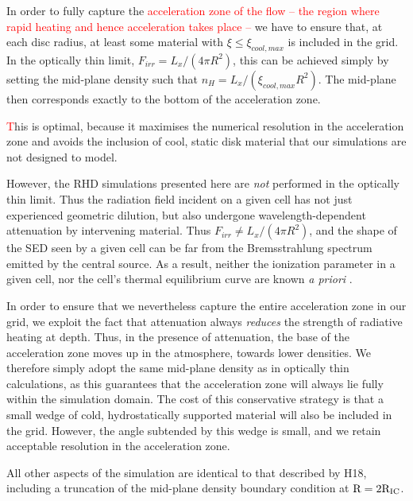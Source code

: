\documentclass[a4paper,fleqn,usenatbib]{mnras}
\begin{document}
In order to fully capture the \textcolor{red}{acceleration zone of the
  flow -- the region where rapid heating and hence acceleration takes place -- }
we have
to ensure that, at each disc radius, at least some material with $\xi
\leq \xi_{cool,max}$ is included in the grid.
In the optically thin limit,
$F_{irr} = L_x / (4\pi R^2)$, this can be achieved simply by setting the 
mid-plane density such that $n_H = L_x / (\xi_{cool,max} R^2)$. The
mid-plane then corresponds exactly to the bottom of the acceleration
zone.  {\textcolor{red} This is optimal, because it maximises the numerical
resolution in the acceleration zone and avoids the
inclusion of cool, static disk material that our simulations are not
designed to model.

However, the RHD simulations presented here are {\em not} performed in
the optically thin limit. Thus the radiation field incident on a given
cell has not just experienced geometric dilution, but also undergone
wavelength-dependent attenuation by intervening material. Thus
$F_{irr} \neq L_x / (4\pi R^2)$, and the shape of the SED seen by a
given cell can be far from the Bremsstrahlung spectrum emitted by the
central source. As a result, neither the ionization parameter in a 
given cell, nor the cell's thermal equilibrium curve are known {\em a
priori} \citep{2017MNRAS.467.4161D}. 

In order to ensure that we nevertheless capture the entire
acceleration zone in our grid, we exploit the fact that attenuation
always {\em reduces} the strength of radiative heating at depth. Thus,
in the presence of attenuation, the base of the acceleration zone
moves up in the atmosphere, towards lower densities. We therefore
simply adopt the same mid-plane density as in optically thin
calculations, as this guarantees that the acceleration zone will
always lie fully within the simulation domain. The cost of this
conservative strategy is that a small wedge of cold, hydrostatically
supported material will also be included in the grid. However,
the angle subtended by this wedge is small, and we retain acceptable 
resolution in the acceleration zone.}

All other aspects of the simulation are identical to that described by
H18, including a truncation of the  mid-plane density boundary
condition at $\rm{R=2 R_{IC}}$.
\end{document}
